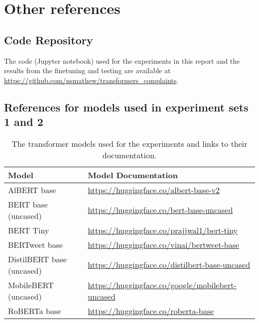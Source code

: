 
\chapter{Other references}

\section{Code Repository}
The code (Jupyter notebook) used for the experiments in this report and the results from the finetuning and testing are available at \url{https://github.com/nsmathew/transformers_complaints}.

\section{References for models used in experiment sets 1 and 2}

\begin{table}[ht]
    \captionsetup{font=small}
    \centering
    \begin{tabularx}{\textwidth}{|l|X|}
        \hline
        \rowcolor[gray]{0.7}
        \textbf{Model}            & \textbf{Model Documentation}                                   \\
        \hline

        AlBERT base               & \small{\url{https://huggingface.co/albert-base-v2}}            \\
        \hline
        BERT base (uncased)       & \small{\url{https://huggingface.co/bert-base-uncased}}         \\
        \hline
        BERT Tiny                 & \small{\url{https://huggingface.co/prajjwal1/bert-tiny}}       \\
        \hline
        BERTweet base             & \small{\url{https://huggingface.co/vinai/bertweet-base}}       \\
        \hline
        DistilBERT base (uncased) & \small{\url{https://huggingface.co/distilbert-base-uncased}}   \\
        \hline
        MobileBERT (uncased)      & \small{\url{https://huggingface.co/google/mobilebert-uncased}} \\
        \hline
        RoBERTa base              & \small{\url{https://huggingface.co/roberta-base}}              \\
        \hline
    \end{tabularx}
    \caption{The transformer models used for the experiments and links to their documentation.}
    \label{tab: apdxb_model_doc}
\end{table}

